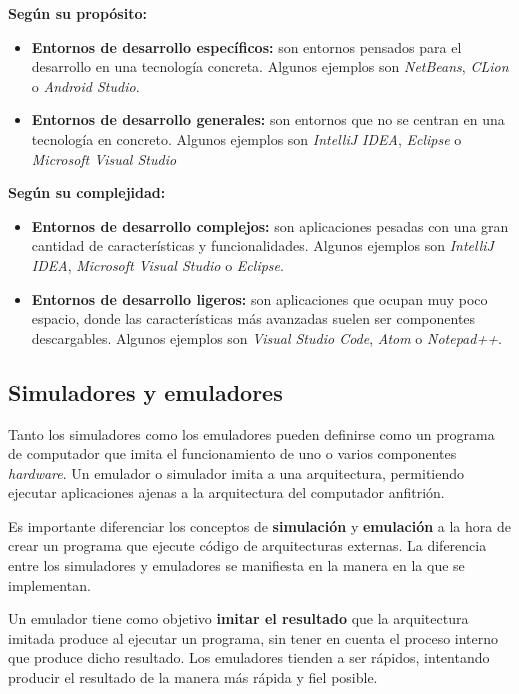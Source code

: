 \textbf{Según su propósito:}
\begin{itemize}
    \item \textbf{Entornos de desarrollo específicos:} son entornos pensados para el desarrollo en una
    tecnología concreta.
    Algunos ejemplos son \textit{NetBeans}, \textit{CLion} o \textit{Android Studio}.
    \item \textbf{Entornos de desarrollo generales:} son entornos que no se centran en una tecnología en concreto.
    Algunos ejemplos son \textit{IntelliJ IDEA}\cite{INTELLIJIDEA},
    \textit{Eclipse}\cite{ECLIPSE} o \textit{Microsoft Visual Studio}\cite{VISUALSTUDIO}
\end{itemize}

\textbf{Según su complejidad:}
\begin{itemize}
    \item \textbf{Entornos de desarrollo complejos:} son aplicaciones pesadas con una gran cantidad de
    características y funcionalidades.
    Algunos ejemplos son \textit{IntelliJ IDEA},
    \textit{Microsoft Visual Studio} o \textit{Eclipse}.
    \item \textbf{Entornos de desarrollo ligeros:} son aplicaciones que ocupan muy poco espacio, donde
    las características más avanzadas suelen ser componentes descargables.
    Algunos ejemplos son \textit{Visual Studio Code}\cite{VISUALSTUDIOCODE},
    \textit{Atom}\cite{ATOM} o \textit{Notepad++}\cite{NOTEPADPP}.
\end{itemize}

\subsection{Simuladores y emuladores}
\label{subsec:simuladores-y-emuladores}

Tanto los simuladores como los emuladores pueden definirse como un
programa de computador que imita el funcionamiento de uno o varios
componentes \textit{hardware}.
Un emulador o simulador imita a una arquitectura, permitiendo
ejecutar aplicaciones ajenas a la arquitectura del computador anfitrión.

Es importante diferenciar los conceptos de \textbf{simulación}
y \textbf{emulación} a la hora de crear un programa que ejecute
código de arquitecturas externas.
La diferencia entre los simuladores y emuladores se manifiesta
en la manera en la que se implementan.

Un emulador tiene como objetivo \textbf{imitar el resultado}
que la arquitectura imitada produce al ejecutar un programa, sin tener
en cuenta el proceso interno que produce dicho resultado.
Los emuladores tienden a ser rápidos, intentando producir el resultado
de la manera más rápida y fiel posible.

